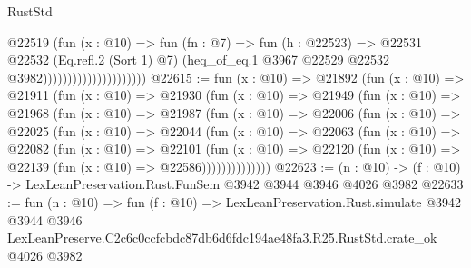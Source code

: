 \begin{lexlean}{RustStd}
\begin{coremodule}
                                        @22519
                                          (fun (x : @10) =>
                                          fun (fn : @7) =>
                                          fun (h : @22523) =>
                                          @22531
                                            @22532
                                            (Eq.refl.{2} (Sort 1) @7)
                                            (heq_of_eq.{1}
                                              @3967
                                              @22529
                                              @22532
                                              @3982)))))))))))))))))))))
@22615 := fun (x : @10) =>
  @21892
    (fun (x : @10) =>
    @21911
      (fun (x : @10) =>
      @21930
        (fun (x : @10) =>
        @21949
          (fun (x : @10) =>
          @21968
            (fun (x : @10) =>
            @21987
              (fun (x : @10) =>
              @22006
                (fun (x : @10) =>
                @22025
                  (fun (x : @10) =>
                  @22044
                    (fun (x : @10) =>
                    @22063
                      (fun (x : @10) =>
                      @22082
                        (fun (x : @10) =>
                        @22101
                          (fun (x : @10) =>
                          @22120 (fun (x : @10) => @22139 (fun (x : @10) => @22586))))))))))))))
@22623 := (n : @10) -> (f : @10) -> LexLeanPreservation.Rust.FunSem @3942 @3944 @3946 @4026 @3982
@22633 := fun (n : @10) =>
  fun (f : @10) =>
  LexLeanPreservation.Rust.simulate
    @3942
    @3944
    @3946
    LexLeanPreserve.C2c6c0ccfcbdc87db6d6fdc194ae48fa3.R25.RustStd.crate_ok
    @4026
    @3982
\end{coremodule}
\end{lexlean}
